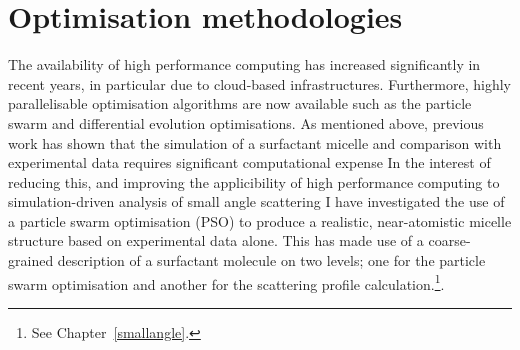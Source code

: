 \section{Optimisation methodologies}
The availability of high performance computing has increased significantly in recent years, in particular due to cloud-based infrastructures.
Furthermore, highly parallelisable optimisation algorithms are now available such as the particle swarm\autocite{kennedy_particle_1995,shi_modified_1998} and differential evolution\autocite{storn_differential_1997} optimisations.
As mentioned above, previous work has shown that the simulation of a surfactant micelle and comparison with experimental data requires significant computational expense\autocite{hargreaves_atomistic_2011,ivanovic_temperature-dependent_2018}
In the interest of reducing this, and improving the applicibility of high performance computing to simulation-driven analysis of small angle scattering I have investigated the use of a particle swarm optimisation (PSO) to produce a realistic, near-atomistic micelle structure based on experimental data alone.
This has made use of a coarse-grained description of a surfactant molecule on two levels; one for the particle swarm optimisation and another for the scattering profile calculation.\footnote{See Chapter~\ref{smallangle}.}.
